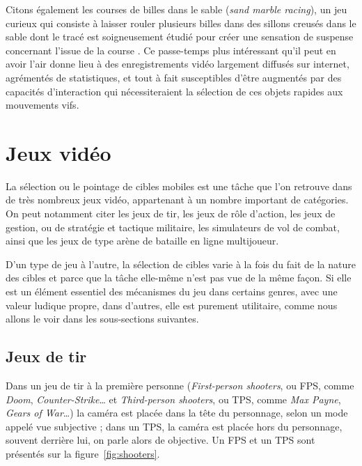 	
	Citons également les courses de billes dans le sable (\emph{sand marble racing}), un jeu curieux qui consiste à laisser rouler plusieurs billes dans des sillons creusés dans le sable dont le tracé est soigneusement étudié pour créer une sensation de suspense concernant l'issue de la \og course \fg{}. Ce passe-temps plus intéressant qu'il peut en avoir l'air donne lieu à des enregistrements vidéo largement diffusés sur internet\footnotemark{}, agrémentés de statistiques, et tout à fait susceptibles d'être augmentés par des capacités d'interaction qui nécessiteraient la sélection de ces objets rapides aux mouvements vifs.
	

	\FloatBarrier	
	\section{Jeux vidéo}
	La sélection ou le pointage de cibles mobiles est une tâche que l'on retrouve dans de très nombreux jeux vidéo, appartenant à un nombre important de catégories. On peut notamment citer les jeux de tir, les jeux de rôle d'action, les jeux de gestion, ou de stratégie et tactique militaire, les simulateurs de vol de combat, ainsi que les jeux de type arène de bataille en ligne multijoueur.
	
	D'un type de jeu à l'autre, la sélection de cibles varie à la fois du fait de la nature des cibles et parce que la tâche elle-même n'est pas vue de la même façon. Si elle est un élément essentiel des mécanismes du jeu dans certains genres, avec une valeur ludique propre, dans d'autres, elle est purement utilitaire, comme nous allons le voir dans les sous-sections suivantes.
	
	\subsection{Jeux de tir}
	Dans un jeu de tir à la première personne (\emph{First-person shooters}, ou FPS, comme \emph{Doom}, \emph{Counter-Strike}\ldots{} et \emph{Third-person shooters}, ou TPS, comme \emph{Max Payne}, \emph{Gears of War}\ldots{}) la caméra est placée \og dans la tête \fg{} du personnage, selon un mode appelé vue subjective ; dans un TPS, la caméra est placée hors du personnage, souvent derrière lui, on parle alors de objective. Un FPS et un TPS sont présentés sur la figure~\ref{fig:shooters}.
	
